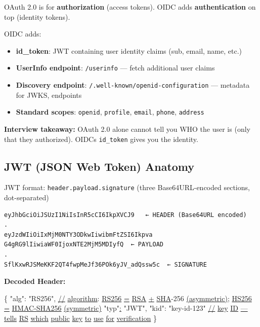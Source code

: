 \documentclass[11pt]{article}
\providecommand{\tightlist}{\setlength{\itemsep}{1pt}\setlength{\parskip}{0pt}}
\newenvironment{Shaded}{\begin{snugshade}}{\end{snugshade}}
\newcommand{\DataTypeTok}[1]{\textcolor[rgb]{0.16,0.50,0.73}{#1}}
\newcommand{\DecValTok}[1]{\textcolor[rgb]{0.96,0.45,0.00}{#1}}
\newcommand{\ErrorTok}[1]{\textcolor[rgb]{0.85,0.27,0.33}{\underline{#1}}}
\newcommand{\FunctionTok}[1]{\textcolor[rgb]{0.56,0.27,0.68}{#1}}
\newcommand{\StringTok}[1]{\textcolor[rgb]{0.96,0.31,0.31}{#1}}
\begin{document}
OAuth 2.0 is for \textbf{authorization} (access tokens). OIDC adds \textbf{authentication} on top (identity tokens).

OIDC adds:

\begin{itemize}
\tightlist
\item
  \textbf{id\_token}: JWT containing user identity claims (sub, email, name, etc.)
\item
  \textbf{UserInfo endpoint}: \texttt{/userinfo} --- fetch additional user claims
\item
  \textbf{Discovery endpoint}: \texttt{/.well-known/openid-configuration} --- metadata for JWKS, endpoints
\item
  \textbf{Standard scopes}: \texttt{openid}, \texttt{profile}, \texttt{email}, \texttt{phone}, \texttt{address}
\end{itemize}

\textbf{Interview takeaway:} OAuth 2.0 alone cannot tell you WHO the user is (only that they authorized). OIDC\textquotesingle s \texttt{id\_token} gives you the identity.

\subsection{JWT (JSON Web Token) Anatomy}\label{jwt-json-web-token-anatomy}

JWT format: \texttt{header.payload.signature} (three Base64URL-encoded sections, dot-separated)

\setcodelang{}

\begin{verbatim}
eyJhbGciOiJSUzI1NiIsInR5cCI6IkpXVCJ9   ← HEADER (Base64URL encoded)
.
eyJzdWIiOiIxMjM0NTY3ODkwIiwibmFtZSI6Ikpva G4gRG9lIiwiaWF0IjoxNTE2MjM5MDIyfQ  ← PAYLOAD
.
SflKxwRJSMeKKF2QT4fwpMeJf36POk6yJV_adQssw5c  ← SIGNATURE
\end{verbatim}

\textbf{Decoded Header:}


\begin{Shaded}
\begin{Highlighting}[]
\FunctionTok{\{}
  \DataTypeTok{"alg"}\FunctionTok{:} \StringTok{"RS256"}\FunctionTok{,}   \ErrorTok{//} \ErrorTok{algorithm}\FunctionTok{:} \ErrorTok{RS256} \ErrorTok{=} \ErrorTok{RSA} \ErrorTok{+} \ErrorTok{SHA}\DecValTok{{-}256} \ErrorTok{(asymmetric);} \ErrorTok{HS256} \ErrorTok{=} \ErrorTok{HMAC{-}SHA256} \ErrorTok{(symmetric)}
  \StringTok{"typ"}\ErrorTok{:} \StringTok{"JWT"}\FunctionTok{,}
  \DataTypeTok{"kid"}\FunctionTok{:} \StringTok{"key{-}id{-}123"}  \ErrorTok{//} \ErrorTok{key} \ErrorTok{ID} \ErrorTok{—} \ErrorTok{tells} \ErrorTok{RS} \ErrorTok{which} \ErrorTok{public} \ErrorTok{key} \ErrorTok{to} \ErrorTok{use} \ErrorTok{for} \ErrorTok{verification}
\FunctionTok{\}}
\end{Highlighting}
\end{Shaded}
\end{document}
